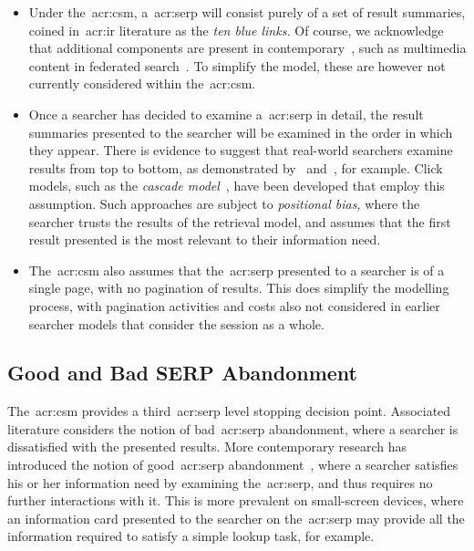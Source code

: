 \begin{itemize}
    
    \item{ Under the~\gls{acr:csm}, a~\gls{acr:serp} will consist purely of a set of result summaries, coined in~\gls{acr:ir} literature as the \emph{ten blue links.} Of course, we acknowledge that additional components are present in contemporary~, such as multimedia content in federated search~\citep{chen2012federated_search_click_model}. To simplify the model, these are however not currently considered within the~\gls{acr:csm}.}
    
    \item{ Once a searcher has decided to examine a~\gls{acr:serp} in detail, the result summaries presented to the searcher will be examined in the order in which they appear. There is evidence to suggest that real-world searchers examine results from top to bottom, as demonstrated by~\cite{joachims2002click_model} and~\cite{joachims2005click_model}, for example. Click models, such as the \emph{cascade model}~\citep{craswell2008click_models}, have been developed that employ this assumption. Such approaches are subject to \emph{positional bias,} where the searcher trusts the results of the retrieval model, and assumes that the first result presented is the most relevant to their information need.}
    
    \item{ The~\gls{acr:csm} also assumes that the~\gls{acr:serp} presented to a searcher is of a single page, with no pagination of results. This does simplify the modelling process, with pagination activities and costs also not considered in earlier searcher models that consider the session as a whole.}
    
\end{itemize}

\subsection{Good and Bad SERP Abandonment}
The~\gls{acr:csm} provides a third~\gls{acr:serp} level stopping decision point. Associated literature considers the notion of bad~\gls{acr:serp} abandonment, where a searcher is dissatisfied with the presented results. More contemporary research has introduced the notion of good~\gls{acr:serp} abandonment~\citep{khabsa2016good_abandonment}, where a searcher satisfies his or her information need by examining the~\gls{acr:serp}, and thus requires no further interactions with it. This is more prevalent on small-screen devices, where an information card presented to the searcher on the~\gls{acr:serp} may provide all the information required to satisfy a simple lookup task, for example.

